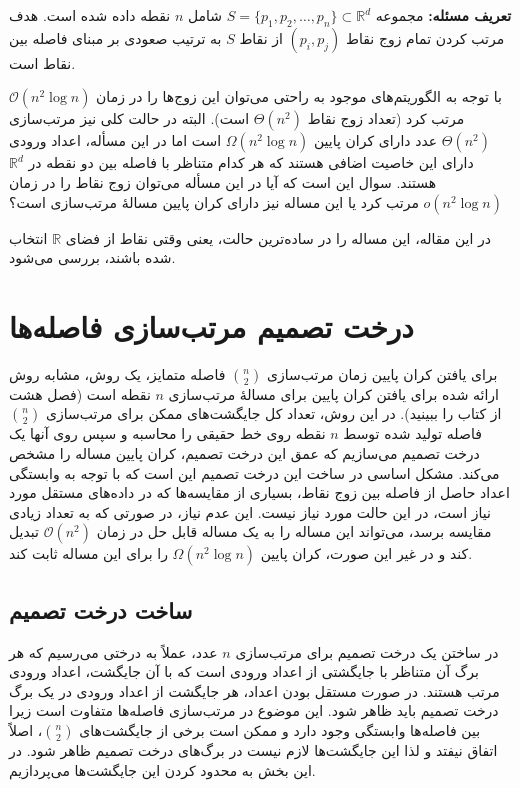 \documentclass[a0,portrait]{a0poster}
\theoremstyle{definition}
\theoremstyle{plain}
\theoremstyle{definition}
\def\OO{\mathcal{O}}
\begin{document}
\begin{multicols}{2}
{\bf تعریف مسئله:} مجموعه $S=\{p_1,p_2,\ldots,p_n\}\subset \mathbb{R}^d$
شامل $n$ نقطه %
داده شده است. 
 هدف مرتب کردن تمام زوج نقاط $(p_i,p_j)$ از نقاط $S$  به ترتیب
صعودی بر مبنای فاصله بین نقاط است. 

با توجه به الگوریتم‌های موجود به راحتی می‌توان این زوج‌ها را در زمان 
$\OO(n^2\log n)$ مرتب کرد (تعداد زوج نقاط $\Theta(n^2)$ است). 
البته در حالت کلی نیز مرتب‌سازی 
$\Theta(n^2)$ عدد دارای کران پایین $\Omega(n^2\log n)$ است 
اما در این مسأله،  اعداد ورودی دارای 
این خاصیت اضافی هستند که هر کدام متناظر با فاصله بین دو نقطه در
 $\mathbb{R}^d$
 هستند. 
سوال این است که آیا در این مسأله می‌توان زوج نقاط را در زمان $o(n^2\log n)$ 
مرتب کرد یا این مساله نیز دارای کران پایین مسالۀ مرتب‌سازی است؟

در این مقاله، این مساله را در ساده‌ترین حالت، یعنی وقتی نقاط از فضای 
$\mathbb{R}$
انتخاب شده باشند، بررسی می‌شود.

\section{درخت تصمیم مرتب‌سازی  فاصله‌ها }
برای یافتن کران پایین زمان مرتب‌سازی  $n\choose 2$ فاصله متمایز، 
یک روش، مشابه روش ارائه شده برای یافتن کران پایین برای مسالۀ مرتب‌سازی  
$n$ نقطه است (فصل هشت از کتاب \cite{clrs-ia-09} را ببینید). 
در این روش،  تعداد کل جایگشت‌های ممکن برای مرتب‌سازی 
 $n \choose 2$ فاصله تولید شده توسط $n$ نقطه روی
 خط  حقیقی  را محاسبه و سپس روی آنها یک درخت تصمیم می‌سازیم
 که عمق این درخت تصمیم، کران پایین مساله  را مشخص می‌کند.  مشکل اساسی در ساخت این
 درخت تصمیم این است که با توجه به وابستگی اعداد حاصل از فاصله بین زوج نقاط، بسیاری از 
 مقایسه‌ها که در داده‌های مستقل مورد نیاز است، در این حالت مورد نیاز نیست. این عدم نیاز، در صورتی که به تعداد زیادی مقایسه برسد، می‌تواند این مساله را به یک مساله قابل حل در زمان $\OO(n^2)$ تبدیل
 کند و در غیر این صورت، کران پایین $\Omega(n^2\log n)$ را برای این مساله ثابت کند.

 \subsection{ساخت درخت تصمیم}

 در ساختن یک درخت تصمیم برای مرتب‌سازی $n$ عدد، عملاً به درختی
 می‌رسیم که هر برگ آن متناظر با جایگشتی از اعداد ورودی است که با آن جایگشت،
 اعداد ورودی مرتب هستند. در صورت  مستقل بودن اعداد، هر جایگشت از اعداد  ورودی
 در یک برگ درخت تصمیم باید ظاهر شود. این موضوع در مرتب‌سازی فاصله‌ها
 متفاوت است زیرا بین فاصله‌ها وابستگی وجود دارد و ممکن است برخی از 
 جایگشت‌های $n\choose 2$، اصلاً اتفاق نیفتد و لذا این جایگشت‌ها لازم نیست
 در برگ‌های درخت تصمیم ظاهر شود. در این بخش به محدود کردن این جایگشت‌ها
 می‌پردازیم. 
 

\end{multicols}
\end{document}

